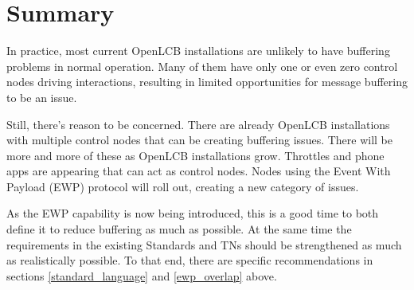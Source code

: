 \documentclass[11pt]{article}
\begin{document}
\section{Summary}

In practice, most current OpenLCB installations 
are unlikely to have buffering problems in normal operation.  Many of them
have only one or even zero control nodes driving interactions, resulting in 
limited opportunities for message buffering to be an issue.

Still, there's reason to be concerned.
There are already OpenLCB installations with multiple control
nodes that can be creating buffering issues.  
There will be more
and more of these as OpenLCB installations grow.  Throttles 
and phone apps are appearing that can act as control nodes.
Nodes using the Event With Payload (EWP) protocol will roll out, creating a new 
category of issues. 

As the EWP capability is now being introduced,
this is a good time to both define it to reduce buffering as much as possible. 
At the same time the requirements in the existing
Standards and TNs should be strengthened as much as realistically possible. 
To that end, there are specific recommendations in sections
\ref{standard_language} and \ref{ewp_overlap} above. 
\end{document}
